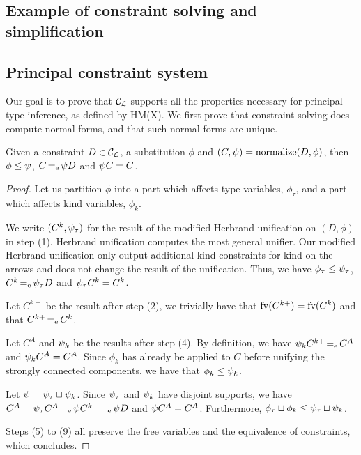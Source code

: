 \subsection{Example of constraint solving and simplification}
\label{solving:example}



\subsection{Principal constraint system}

Our goal is to prove that ${\mathcal C_{\mathcal L}}$ supports all the properties necessary for
principal type inference, as defined by HM(X).
We first prove that constraint solving
does compute normal forms, and that such normal forms are unique.


\begin{lemma}
  \label{lemma:normalform}
  Given a constraint $D\in{\mathcal C_{\mathcal L}}$, a substitution $\phi$ and
  $(C,\mathrm{\psi}) = \operatorname{normalize}(D,\phi)$,
  then $\phi\leq\mathrm{\psi}$,
  $C \operatorname{=_e} \mathrm{\psi} D$ and
  $\mathrm{\psi} C = C$.
\end{lemma}
\begin{proof}
  Let us partition $\phi$ into a part which affects type variables,
  $\phi_\tau$, and a part which affects kind variables, $\phi_k$.

  We write $(C^k,\mathrm{\psi}_\tau)$ for the result of
  the modified Herbrand unification on $(D,\phi)$ in step (1).
  Herbrand unification computes the most general
  unifier. Our modified Herbrand unification only output additional
  kind constraints for kind on the arrows and does not change
  the result of the unification. Thus, we have
  $\phi_\tau\leq\mathrm{\psi}_\tau$,
  $C^k \operatorname{=_e} \mathrm{\psi}_\tau D$ and
  $\mathrm{\psi}_\tau C^k = C^k$.

  Let $C^{k+}$ be the result after step (2), we trivially have that
  $\operatorname{fv}(C^{k+}) = \operatorname{fv}(C^k)$ and that $C^{k+} \operatorname{=_e} C^k$.

  Let $C^{A}$ and $\mathrm{\psi}_k$ be the results after step (4).
  By definition, we have $\mathrm{\psi}_k C^{k+} \operatorname{=_e} C^{A}$ and
  $\mathrm{\psi}_k C^{A} = C^{A}$. Since $\phi_k$ has already be applied to $C$ before
  unifying the strongly connected components,
  we have that $\phi_k\leq\mathrm{\psi}_k$.

  Let $\mathrm{\psi} = \mathrm{\psi}_\tau \sqcup \mathrm{\psi}_k$. Since $\mathrm{\psi}_\tau$ and $\mathrm{\psi}_k$
  have disjoint supports,
  we have $C^{A} = \mathrm{\psi}_\tau C^{A} \operatorname{=_e} \mathrm{\psi} C^{k+} \operatorname{=_e} \mathrm{\psi} D$
  and $\mathrm{\psi} C^{A} = C^{A}$.
  Furthermore, $\phi_\tau \sqcup \phi_k \leq \mathrm{\psi}_\tau \sqcup \mathrm{\psi}_k$.

  Steps (5) to (9) all preserve the free variables and the equivalence
  of constraints, which concludes.
\end{proof}

